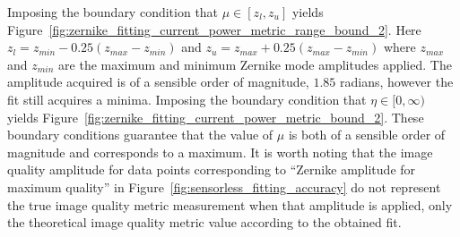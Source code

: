 Imposing the boundary condition that $\mu \in [z_{l}, z_{u}]$ yields 
Figure~\ref{fig:zernike_fitting_current_power_metric_range_bound_2}. Here 
$z_{l} = z_{min} - 0.25(z_{max}-z_{min})$ and $z_{u} = z_{max} + 
0.25(z_{max}-z_{min})$ where $z_{max}$ and $z_{min}$ are the maximum and 
minimum Zernike mode amplitudes applied. The amplitude acquired is of a 
sensible order of magnitude, $1.85$ radians, however the fit still acquires 
a minima. Imposing the boundary condition that $\eta \in [0, \infty)$ 
yields Figure~\ref{fig:zernike_fitting_current_power_metric_bound_2}. These 
boundary conditions guarantee that the value of $\mu$ is both of a sensible 
order of magnitude and corresponds to a maximum. It is worth noting that 
the image quality amplitude for data points corresponding to ``Zernike 
amplitude for maximum quality'' in 
Figure~\ref{fig:sensorless_fitting_accuracy} do not represent the true 
image quality metric measurement when that amplitude is applied, only the 
theoretical image quality metric value according to the obtained fit. 

